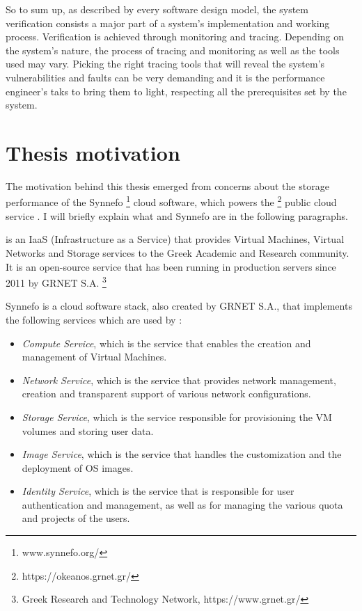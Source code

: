 So to sum up, as described by every software design model, the system
verification consists a major part of a system's implementation and working
process. Verification is achieved through monitoring and tracing. Depending on
the system's nature, the process of tracing and monitoring as well as the tools
used may vary. Picking the right tracing tools that will reveal the system's
vulnerabilities and faults can be very demanding and it is the performance
engineer's taks to bring them to light, respecting all the prerequisites set by
the system.

\section{Thesis motivation}
The motivation behind this thesis emerged from concerns about the storage 
performance of the Synnefo \footnote{www.synnefo.org/} cloud software, which 
powers the \okeanos \footnote{https://okeanos.grnet.gr/} public cloud service 
\cite{okeanos}. I will briefly explain what \okeanos and Synnefo are in the 
following paragraphs.

\okeanos is an IaaS (Infrastructure as a Service) that provides Virtual 
Machines, Virtual Networks and Storage services to the Greek Academic and 
Research community. It is an open-source service that has been running in 
production servers since 2011 by GRNET S.A.
\footnote{Greek Research and Technology Network, https://www.grnet.gr/}

Synnefo \cite{synnefo} is a cloud software stack, also created by GRNET S.A., 
that implements the following services which are used by \okeanos:

\begin{itemize}
    \item \textit{Compute Service}, which is the service that enables the 
        creation and management of Virtual Machines.
    \item \textit{Network Service}, which is the service that provides network 
        management, creation and transparent support of various network 
        configurations.
    \item \textit{Storage Service}, which is the service responsible for 
        provisioning the VM volumes and storing user data.
    \item \textit{Image Service}, which is the service that handles the 
        customization and the deployment of OS images.
    \item \textit{Identity Service}, which is the service that is responsible 
        for user authentication and management, as well as for managing the 
        various quota and projects of the users.
\end{itemize}

